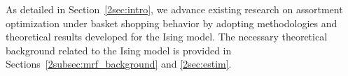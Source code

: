 As detailed in Section~\ref{2sec:intro}, we advance existing research on assortment optimization under basket shopping behavior by adopting methodologies and theoretical results developed for the Ising model. The necessary theoretical background related to the Ising model is provided in Sections~\ref{2subsec:mrf_background} and \ref{2sec:estim}.



\vspace{-0.04cm}